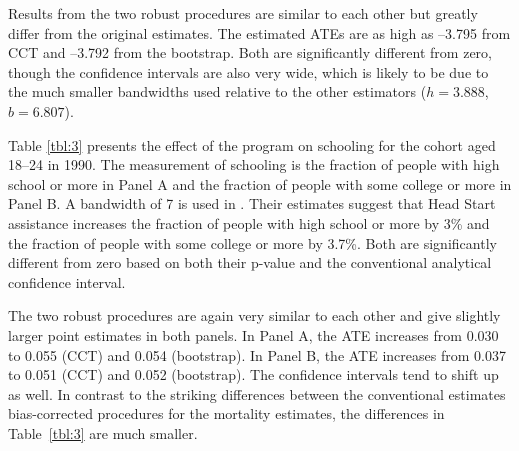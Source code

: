 \documentclass[12pt,fleqn]{article}
\begin{document}
Results from the two robust procedures are similar to each other but greatly
differ from the original estimates. The estimated ATEs are as high as --3.795
from CCT and --3.792 from the bootstrap. Both are significantly different from
zero, though the confidence intervals are also very wide, which is likely to be
due to the much smaller bandwidths used relative to the other estimators
($h=3.888$, $b=6.807$).

Table \ref{tbl:3} presents the effect of the program on schooling for the cohort
aged 18--24 in 1990. The measurement of schooling is the fraction of people with
high school or more in Panel A and the fraction of people with some college or
more in Panel B. A bandwidth of 7 is used in \cite{ludwig2007}. Their estimates
suggest that Head Start assistance increases the fraction of people with high
school or more by 3\% and the fraction of people with some college or more by
3.7\%. Both are significantly different from zero based on both their p-value
and the conventional analytical confidence interval.

The two robust procedures are again very similar to each other and give slightly
larger point estimates in both panels. In Panel A, the ATE increases from 0.030
to 0.055 (CCT) and 0.054 (bootstrap). In Panel B, the ATE increases from 0.037
to 0.051 (CCT) and 0.052 (bootstrap). The confidence intervals tend to shift up
as well.  In contrast to the striking differences between the conventional
estimates bias-corrected procedures for the mortality estimates, the differences
in Table~\ref{tbl:3} are much smaller.
\end{document}
